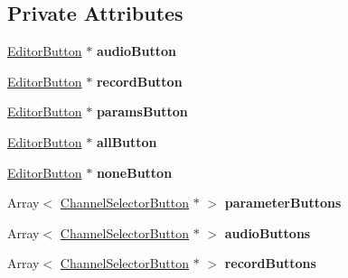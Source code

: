 \subsection*{Private Attributes}
\begin{DoxyCompactItemize}
\item 
\hypertarget{classChannelSelector_a125d243727b3c6eb3a3e805d393ff655}{\hyperlink{classEditorButton}{Editor\-Button} $\ast$ {\bfseries audio\-Button}}\label{classChannelSelector_a125d243727b3c6eb3a3e805d393ff655}

\item 
\hypertarget{classChannelSelector_ad5613602460b2a19bd0c6e720488c406}{\hyperlink{classEditorButton}{Editor\-Button} $\ast$ {\bfseries record\-Button}}\label{classChannelSelector_ad5613602460b2a19bd0c6e720488c406}

\item 
\hypertarget{classChannelSelector_a1d83f4095fbeec31e17cd8ad9211c2d4}{\hyperlink{classEditorButton}{Editor\-Button} $\ast$ {\bfseries params\-Button}}\label{classChannelSelector_a1d83f4095fbeec31e17cd8ad9211c2d4}

\item 
\hypertarget{classChannelSelector_a0d3097d2e792c9b61a1977d49c43e9a9}{\hyperlink{classEditorButton}{Editor\-Button} $\ast$ {\bfseries all\-Button}}\label{classChannelSelector_a0d3097d2e792c9b61a1977d49c43e9a9}

\item 
\hypertarget{classChannelSelector_a4bad9aed3443274ab65b227f48e1d2a3}{\hyperlink{classEditorButton}{Editor\-Button} $\ast$ {\bfseries none\-Button}}\label{classChannelSelector_a4bad9aed3443274ab65b227f48e1d2a3}

\item 
\hypertarget{classChannelSelector_a90f23d0226bfeb29ea5d261bb602be9b}{Array$<$ \hyperlink{classChannelSelectorButton}{Channel\-Selector\-Button} $\ast$ $>$ {\bfseries parameter\-Buttons}}\label{classChannelSelector_a90f23d0226bfeb29ea5d261bb602be9b}

\item 
\hypertarget{classChannelSelector_ac50e843be255ca04b83a4d28907511a1}{Array$<$ \hyperlink{classChannelSelectorButton}{Channel\-Selector\-Button} $\ast$ $>$ {\bfseries audio\-Buttons}}\label{classChannelSelector_ac50e843be255ca04b83a4d28907511a1}

\item 
\hypertarget{classChannelSelector_ae7cbcfb0a437434a59077847cbf48360}{Array$<$ \hyperlink{classChannelSelectorButton}{Channel\-Selector\-Button} $\ast$ $>$ {\bfseries record\-Buttons}}\label{classChannelSelector_ae7cbcfb0a437434a59077847cbf48360}


\end{DoxyCompactItemize}
